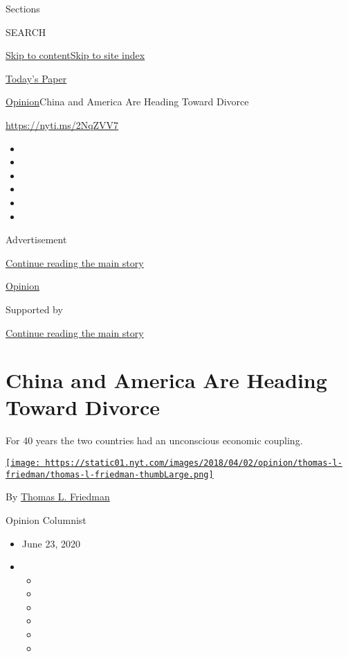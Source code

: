 Sections

SEARCH

\protect\hyperlink{site-content}{Skip to
content}\protect\hyperlink{site-index}{Skip to site index}

\href{https://myaccount.nytimes.com/auth/login?response_type=cookie\&client_id=vi}{}

\href{https://www.nytimes.com/section/todayspaper}{Today's Paper}

\href{/section/opinion}{Opinion}\textbar{}China and America Are Heading
Toward Divorce

\href{https://nyti.ms/2NqZVV7}{https://nyti.ms/2NqZVV7}

\begin{itemize}
\item
\item
\item
\item
\item
\item
\end{itemize}

Advertisement

\protect\hyperlink{after-top}{Continue reading the main story}

\href{/section/opinion}{Opinion}

Supported by

\protect\hyperlink{after-sponsor}{Continue reading the main story}

\hypertarget{china-and-america-are-heading-toward-divorce}{%
\section{China and America Are Heading Toward
Divorce}\label{china-and-america-are-heading-toward-divorce}}

For 40 years the two countries had an unconscious economic coupling.

\href{https://www.nytimes.com/by/thomas-l-friedman}{\texttt{[image: https://static01.nyt.com/images/2018/04/02/opinion/thomas-l-friedman/thomas-l-friedman-thumbLarge.png]}}

By \href{https://www.nytimes.com/by/thomas-l-friedman}{Thomas L.
Friedman}

Opinion Columnist

\begin{itemize}
\item
  June 23, 2020
\item
  \begin{itemize}
  \item
  \item
  \item
  \item
  \item
  \item
  \end{itemize}
\end{itemize}

